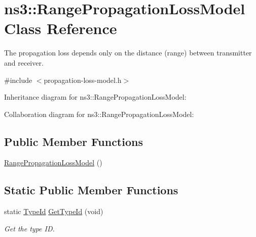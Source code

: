 \hypertarget{classns3_1_1RangePropagationLossModel}{}\section{ns3\+:\+:Range\+Propagation\+Loss\+Model Class Reference}
\label{classns3_1_1RangePropagationLossModel}


The propagation loss depends only on the distance (range) between transmitter and receiver.  




{\ttfamily \#include $<$propagation-\/loss-\/model.\+h$>$}



Inheritance diagram for ns3\+:\+:Range\+Propagation\+Loss\+Model\+:


Collaboration diagram for ns3\+:\+:Range\+Propagation\+Loss\+Model\+:
\subsection*{Public Member Functions}
\begin{DoxyCompactItemize}
\item 
\hyperlink{classns3_1_1RangePropagationLossModel_a1741fbaeeefdebac788da0b30484f0d7}{Range\+Propagation\+Loss\+Model} ()
\end{DoxyCompactItemize}
\subsection*{Static Public Member Functions}
\begin{DoxyCompactItemize}
\item 
static \hyperlink{classns3_1_1TypeId}{Type\+Id} \hyperlink{classns3_1_1RangePropagationLossModel_a724fad1b36ef9ca692f451304e23b4d5}{Get\+Type\+Id} (void)
\begin{DoxyCompactList}\small\item\em Get the type ID. \end{DoxyCompactList}\end{DoxyCompactItemize}
